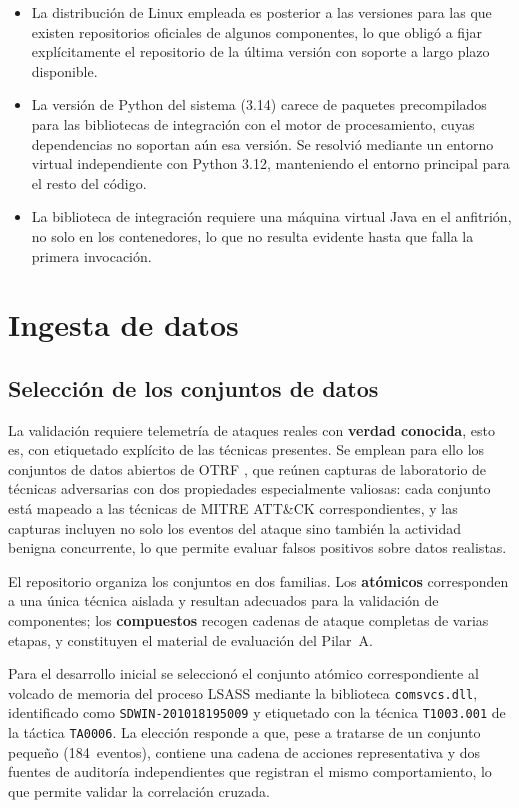 \begin{itemize}
    \item La distribución de Linux empleada es posterior a las versiones para las que existen
    repositorios oficiales de algunos componentes, lo que obligó a fijar explícitamente el
    repositorio de la última versión con soporte a largo plazo disponible.
    \item La versión de Python del sistema (3.14) carece de paquetes precompilados para las
    bibliotecas de integración con el motor de procesamiento, cuyas dependencias no soportan
    aún esa versión. Se resolvió mediante un entorno virtual independiente con Python 3.12,
    manteniendo el entorno principal para el resto del código.
    \item La biblioteca de integración requiere una máquina virtual Java en el anfitrión, no
    solo en los contenedores, lo que no resulta evidente hasta que falla la primera
    invocación.
\end{itemize}

\section{Ingesta de datos}

\subsection{Selección de los conjuntos de datos}

La validación requiere telemetría de ataques reales con \textbf{verdad conocida}, esto es,
con etiquetado explícito de las técnicas presentes. Se emplean para ello los conjuntos de
datos abiertos de OTRF \cite{otrf}, que reúnen capturas de laboratorio de técnicas
adversarias con dos propiedades especialmente valiosas: cada conjunto está mapeado a las
técnicas de MITRE ATT\&CK correspondientes, y las capturas incluyen no solo los eventos del
ataque sino también la actividad benigna concurrente, lo que permite evaluar falsos
positivos sobre datos realistas.

El repositorio organiza los conjuntos en dos familias. Los \textbf{atómicos} corresponden a
una única técnica aislada y resultan adecuados para la validación de componentes; los
\textbf{compuestos} recogen cadenas de ataque completas de varias etapas, y constituyen el
material de evaluación del Pilar~A.

Para el desarrollo inicial se seleccionó el conjunto atómico correspondiente al volcado de
memoria del proceso LSASS mediante la biblioteca \texttt{comsvcs.dll}, identificado como
\texttt{SDWIN-201018195009} y etiquetado con la técnica \texttt{T1003.001} de la táctica
\texttt{TA0006}. La elección responde a que, pese a tratarse de un conjunto pequeño
(184~eventos), contiene una cadena de acciones representativa y dos fuentes de auditoría
independientes que registran el mismo comportamiento, lo que permite validar la correlación
cruzada.

